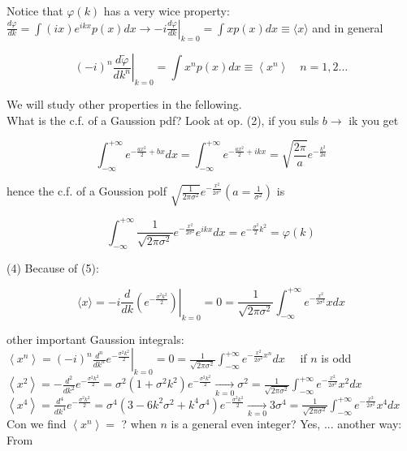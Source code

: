 \documentclass[10pt]{article}
\begin{document}
Notice that $\varphi(k)$ has a very wice property:\\
$\frac{d \varphi}{d k}=\int(i x) e^{i k x} p(x) d x \rightarrow-\left.i \frac{d \varphi}{d k}\right|_{k=0}=\int x p(x) d x \equiv\langle x\rangle$ and in general


\begin{equation*}
\left.(-i)^{n} \frac{d \tilde{\varphi}}{d k^{n}}\right|_{k=0}=\int x^{n} p(x) d x \equiv\left\langle x^{n}\right\rangle \quad n=1,2 \ldots \tag{5}
\end{equation*}


We will study other properties in the fellowing.\\
What is the c.f. of a Gaussion pdf? Look at op. (2), if you suls $b \rightarrow$ ik you get


\begin{equation*}
\int_{-\infty}^{+\infty} e^{-\frac{a x^{2}}{2}+b x} d x=\int_{-\infty}^{+\infty} e^{-\frac{a x^{2}}{2}+i k x}=\sqrt{\frac{2 \pi}{a}} e^{-\frac{k^{2}}{2 a}} \tag{3}
\end{equation*}


hence the c.f. of a Goussion polf $\sqrt{\frac{1}{2 \pi \sigma^{2}}} e^{-\frac{x^{2}}{2 \sigma^{2}}}\left(a=\frac{1}{\sigma^{2}}\right)$ is


\begin{equation*}
\int_{-\infty}^{+\infty} \frac{1}{\sqrt{2 \pi \sigma^{2}}} e^{-\frac{x^{2}}{2 \sigma^{2}}} e^{i k x} d x=e^{-\frac{\sigma^{2}}{2} k^{2}}=\varphi(k) \tag{6}
\end{equation*}


(4) Because of (5):

$$
\langle x\rangle=-\left.i \frac{d}{d k}\left(e^{-\frac{\sigma^{2} k^{2}}{2}}\right)\right|_{k=0}=0=\frac{1}{\sqrt{2 \pi \sigma^{2}}} \int_{-\infty}^{+\infty} e^{-\frac{x^{2}}{2 \sigma^{2}}} x d x
$$

other important Gaussion integrals:\\
$\left\langle x^{n}\right\rangle=\left.(-i)^{n} \frac{d^{n}}{d k^{n}} e^{-\frac{\sigma^{2} k^{2}}{2}}\right|_{k=0}=0=\frac{1}{\sqrt{2 \pi \sigma^{2}}} \int_{-\infty}^{+\infty} e^{-\frac{x^{2}}{2 \sigma^{2}} x^{n}} d x \quad$ if $n$ is odd\\
$\left\langle x^{2}\right\rangle=-\frac{d^{2}}{d k^{2}} e^{-\frac{\sigma^{2} k^{2}}{2}}=\sigma^{2}\left(1+\sigma^{2} k^{2}\right) e^{-\frac{\sigma^{2} k^{2}}{2}} \underset{k=0}{\rightarrow} \sigma^{2}=\frac{1}{\sqrt{2 \pi \sigma^{2}}} \int_{-\infty}^{+\infty} e^{-\frac{x^{2}}{2 \sigma^{2}}} x^{2} d x$\\
$\left\langle x^{4}\right\rangle=\frac{d^{4}}{d k^{4}} e^{-\frac{\sigma^{2} k^{2}}{2}}=\sigma^{4}\left(3-6 k^{2} \sigma^{2}+k^{4} \sigma^{4}\right) e^{-\frac{\sigma^{2} k^{2}}{2}} \underset{k=0}{\longrightarrow} 3 \sigma^{4}=\frac{1}{\sqrt{2 \pi \sigma^{2}}} \int_{-\infty}^{+\infty} e^{-\frac{x^{2}}{2 \sigma^{2}}} x^{4} d x$\\
Con we find $\left\langle x^{n}\right\rangle=$ ? when $n$ is a general even integer? Yes, ... another way:\\
From
\end{document}
